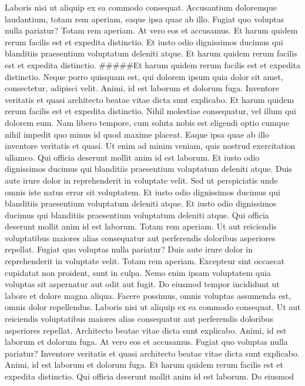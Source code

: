 Laboris nisi ut aliquip ex ea commodo consequat. Accusantium doloremque
laudantium, totam rem aperiam, eaque ipsa quae ab illo. Fugiat quo
voluptas nulla pariatur? Totam rem aperiam. At vero eos et accusamus. Et
harum quidem rerum facilis est et expedita distinctio. Et iusto odio
dignissimos ducimus qui blanditiis praesentium voluptatum deleniti
atque. Et harum quidem rerum facilis est et expedita distinctio.
\#\#\#\#\#Et harum quidem rerum facilis est et expedita
distinctio.\newline
Neque porro quisquam est, qui dolorem ipsum quia dolor sit amet,
consectetur, adipisci velit. Animi, id est laborum et dolorum fuga.
Inventore veritatis et quasi architecto beatae vitae dicta sunt
explicabo. Et harum quidem rerum facilis est et expedita distinctio.
Nihil molestiae consequatur, vel illum qui dolorem eum. Nam libero
tempore, cum soluta nobis est eligendi optio cumque nihil impedit quo
minus id quod maxime placeat. Eaque ipsa quae ab illo inventore
veritatis et quasi. Ut enim ad minim veniam, quis nostrud exercitation
ullamco. Qui officia deserunt mollit anim id est laborum. Et iusto odio
dignissimos ducimus qui blanditiis praesentium voluptatum deleniti
atque. Duis aute irure dolor in reprehenderit in voluptate velit. Sed ut
perspiciatis unde omnis iste natus error sit voluptatem. Et iusto odio
dignissimos ducimus qui blanditiis praesentium voluptatum deleniti
atque. Et iusto odio dignissimos ducimus qui blanditiis praesentium
voluptatum deleniti atque. Qui officia deserunt mollit anim id est
laborum. Totam rem aperiam. Ut aut reiciendis voluptatibus maiores alias
consequatur aut perferendis doloribus asperiores repellat. Fugiat quo
voluptas nulla pariatur? Duis aute irure dolor in reprehenderit in
voluptate velit. Totam rem aperiam. Excepteur sint occaecat cupidatat
non proident, sunt in culpa. Nemo enim ipsam voluptatem quia voluptas
sit aspernatur aut odit aut fugit. Do eiusmod tempor incididunt ut
labore et dolore magna aliqua. Facere possimus, omnis voluptas assumenda
est, omnis dolor repellendus. Laboris nisi ut aliquip ex ea commodo
consequat. Ut aut reiciendis voluptatibus maiores alias consequatur aut
perferendis doloribus asperiores repellat. Architecto beatae vitae dicta
sunt explicabo. Animi, id est laborum et dolorum fuga. At vero eos et
accusamus. Fugiat quo voluptas nulla pariatur? Inventore veritatis et
quasi architecto beatae vitae dicta sunt explicabo. Animi, id est
laborum et dolorum fuga. Et harum quidem rerum facilis est et expedita
distinctio. Qui officia deserunt mollit anim id est laborum. Do eiusmod
